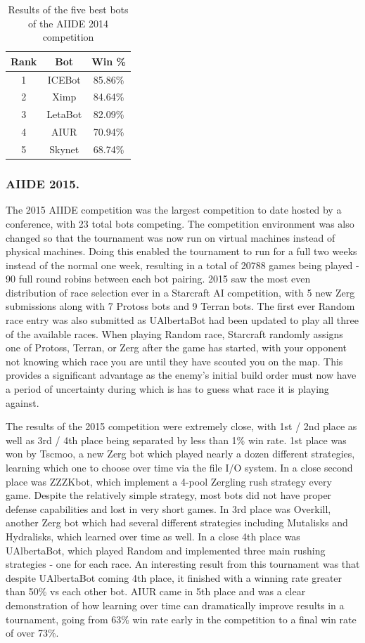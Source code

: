 \documentclass{llncs}
\begin{document}
\begin{table}[!t]
\caption{Results of the five best bots of the AIIDE 2014 competition}
\label{tab:aiide2014}
\centering
\begin{tabular}{|c|c|c|}
\hline
{\bfseries Rank} & {\bfseries Bot} & {\bfseries Win \%} \\
\hline
1 & ICEBot & 85.86\% \\
2 & Ximp & 84.64\% \\
3 & LetaBot & 82.09\% \\
4 & AIUR & 70.94\% \\
5 & Skynet & 68.74\% \\
\hline
\end{tabular}
\end{table}

\subsubsection{AIIDE 2015.}

The 2015 AIIDE competition was  the largest competition to date hosted
by a conference, with 23 total bots competing. The competition environment was also changed so that the tournament was now run on virtual machines instead of physical machines. Doing this enabled the tournament to run for a full two weeks instead of the normal one week, resulting in a total of 20788 games being played - 90 full round robins between each bot pairing. 2015 saw the most even distribution of race selection ever in a Starcraft AI competition, with 5 new Zerg submissions along with 7 Protoss bots and 9 Terran bots. The first ever Random race entry was also submitted as UAlbertaBot had been updated to play all three of the available races. When playing Random race, Starcraft randomly assigns one of Protoss, Terran, or Zerg after the game has started, with your opponent not knowing which race you are until they have scouted you on the map. This provides a significant advantage as the enemy's initial build order must now have a period of uncertainty during which is has to guess what race it is playing against.

The results of the 2015 competition were extremely close, with 1st / 2nd place as well as 3rd / 4th place being separated by less than 1\% win rate. 1st place was won by Tscmoo, a new Zerg bot which played nearly a dozen different strategies, learning which one to choose over time via the file I/O system. In a close second place was ZZZKbot, which implement a 4-pool Zergling rush strategy every game. Despite the relatively simple strategy, most bots did not have proper defense capabilities and lost in very short games. In 3rd place was Overkill, another Zerg bot which had several different strategies including Mutalisks and Hydralisks, which learned over time as well. In a close 4th place was UAlbertaBot, which played Random and implemented three main rushing strategies - one for each race. An interesting result from this tournament was that despite UAlbertaBot coming 4th place, it finished with a winning rate greater than 50\% vs each other bot. AIUR came in 5th place and was a clear demonstration of how learning over time can dramatically improve results in a tournament, going from 63\% win rate early in the competition to a final win rate of over 73\%.
\end{document}
